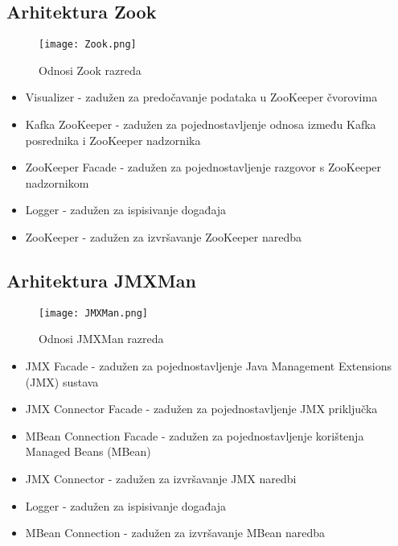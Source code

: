 \documentclass[utf8, diplomski, lmodern, numeric]{fer}
\begin{document}
\subsection{Arhitektura Zook}

\begin{figure}[H]
    \centering
    \texttt{[image: Zook.png]}
    \caption{Odnosi Zook razreda}
    \label{fig:zookeeper-kafka}
\end{figure}

\begin{itemize}
    \item Visualizer - zadužen za predočavanje podataka u ZooKeeper čvorovima
    \item Kafka ZooKeeper - zadužen za pojednostavljenje odnosa između Kafka posrednika i ZooKeeper nadzornika
    \item ZooKeeper Facade - zadužen za pojednostavljenje razgovor s ZooKeeper nadzornikom
    \item Logger - zadužen za ispisivanje događaja
    \item ZooKeeper - zadužen za izvršavanje ZooKeeper naredba
\end{itemize}

\subsection{Arhitektura JMXMan}

\begin{figure}[H]
    \centering
    \texttt{[image: JMXMan.png]}
    \caption{Odnosi JMXMan razreda}
    \label{fig:jmx-client}
\end{figure}

\begin{itemize}
    \item JMX Facade - zadužen za pojednostavljenje Java Management Extensions (JMX) sustava
    \item JMX Connector Facade - zadužen za pojednostavljenje JMX priključka
    \item MBean Connection Facade - zadužen za pojednostavljenje korištenja Managed Beans (MBean)
    \item JMX Connector - zadužen za izvršavanje JMX naredbi
    \item Logger - zadužen za ispisivanje događaja
    \item MBean Connection - zadužen za izvršavanje MBean naredba
\end{itemize}
\end{document}
